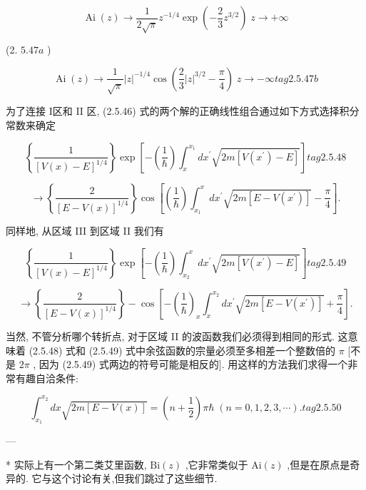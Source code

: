 \documentclass[lang=cn,newtx,10pt,scheme=chinese,thmcnt=section]{elegantbook}
\begin{document}
$$
\operatorname{Ai}\left( z\right) \rightarrow \frac{1}{2\sqrt{\pi }}{z}^{-1/4}\exp \left( {-\frac{2}{3}{z}^{3/2}}\right) \;z \rightarrow + \infty
$$

(2. ${5.47a}$ )

$$
\operatorname{Ai}\left( z\right) \rightarrow \frac{1}{\sqrt{\pi }}{\left| z\right| }^{-1/4}\cos \left( {\frac{2}{3}{\left| z\right| }^{3/2} - \frac{\pi }{4}}\right) \;z \rightarrow - \infty tag{2.5.47b}
$$

为了连接 I区和 II 区, (2.5.46) 式的两个解的正确线性组合通过如下方式选择积分常数来确定

$$
\left\{ \frac{1}{{\left\lbrack V\left( x\right) - E\right\rbrack }^{1/4}}\right\} \exp \left\lbrack {-\left( \frac{1}{\hbar }\right) {\int }_{x}^{{x}_{1}}d{x}^{\prime }\sqrt{{2m}\left\lbrack {V\left( {x}^{\prime }\right) - E}\right\rbrack }}\right\rbrack tag{2.5.48}
$$

$$
\rightarrow \left\{ \frac{2}{{\left\lbrack E - V\left( x\right) \right\rbrack }^{1/4}}\right\} \cos \left\lbrack {\left( \frac{1}{\hbar }\right) {\int }_{{x}_{1}}^{x}d{x}^{\prime }\sqrt{{2m}\left\lbrack {E - V\left( {x}^{\prime }\right) }\right\rbrack } - \frac{\pi }{4}}\right\rbrack .
$$

同样地, 从区域 III 到区域 II 我们有

$$
\left\{ \frac{1}{{\left\lbrack V\left( x\right) - E\right\rbrack }^{1/4}}\right\} \exp \left\lbrack {-\left( \frac{1}{\hbar }\right) {\int }_{{x}_{2}}^{x}d{x}^{\prime }\sqrt{{2m}\left\lbrack {V\left( {x}^{\prime }\right) - E}\right\rbrack }}\right\rbrack tag{2.5.49}
$$

$$
\rightarrow \left\{ \frac{2}{{\left\lbrack E - V\left( x\right) \right\rbrack }^{1/4}}\right\} - \cos \left\lbrack {-{\left( \frac{1}{\hbar }\right) }_{x}{\int }_{x}^{{x}_{2}}d{x}^{\prime }\sqrt{{2m}\left\lbrack {E - V\left( {x}^{\prime }\right) }\right\rbrack } + \frac{\pi }{4}}\right\rbrack .
$$

当然, 不管分析哪个转折点, 对于区域 II 的波函数我们必须得到相同的形式. 这意味着 (2.5.48) 式和 (2.5.49) 式中余弦函数的宗量必须至多相差一个整数倍的 $\pi$ [不是 ${2\pi }$ , 因为 (2.5.49) 式两边的符号可能是相反的]. 用这样的方法我们求得一个非常有趣自洽条件:

$$
{\int }_{{x}_{1}}^{{x}_{2}}{dx}\sqrt{{2m}\left\lbrack {E - V\left( x\right) }\right\rbrack } = \left( {n + \frac{1}{2}}\right) \pi \hbar \;\left( {n = 0,1,2,3,\cdots }\right) . tag{2.5.50}
$$

---

* 实际上有一个第二类艾里函数, $\mathrm{{Bi}}\left( z\right)$ ,它非常类似于 $\mathrm{{Ai}}\left( z\right)$ ,但是在原点是奇异的. 它与这个讨论有关,但我们跳过了这些细节.
\end{document}
